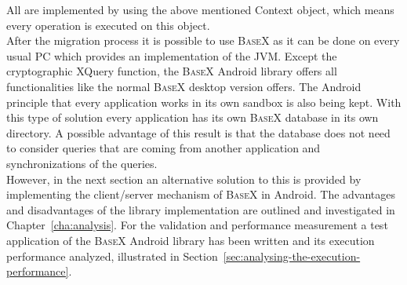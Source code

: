 All are implemented by using the above mentioned Context object, which means every operation is executed on this object.\\
After the migration process it is possible to use \textsc{BaseX} as it can be done on every usual PC which provides an implementation of the JVM.
Except the cryptographic XQuery function, the \textsc{BaseX} Android library offers all functionalities like the normal \textsc{BaseX} desktop version offers.
The Android principle that every application works in its own sandbox is also being kept.
With this type of solution every application has its own \textsc{BaseX} database in its own directory.
A possible advantage of this result is that the database does not need to consider queries that are coming from another application and synchronizations of the queries.\\
However, in the next section an alternative solution to this is provided by implementing the client/server mechanism of \textsc{BaseX} in Android.
The advantages and disadvantages of the library implementation are outlined and investigated in Chapter~\ref{cha:analysis}.
For the validation and performance measurement a test application of the \textsc{BaseX} Android library has been written and its execution performance analyzed, illustrated in Section~\ref{sec:analysing-the-execution-performance}.

